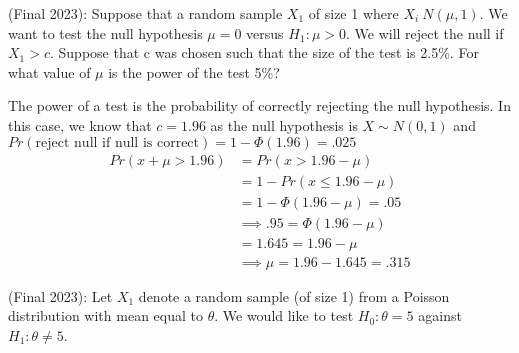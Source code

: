\documentclass[answers]{exam}
\begin{document}
\begin{questions}
\question (Final 2023): Suppose that a random sample $X_1$ of size 1 where $X_i ~ N(\mu,1)$. We want to test the null hypothesis $\mu=0$ versus $H_1: \mu > 0$. We will reject the null if $X_1 > c$. Suppose that c was chosen such that the size of the test is 2.5\%. For what value of $\mu$ is the power of the test 5\%?
\begin{solution}
    The power of a test is the probability of correctly rejecting the null hypothesis. In this case, we know that $c = 1.96$ as the null hypothesis is $X \sim N(0,1)$ and\\
     $Pr(\text{reject null if null is correct}) = 1-\Phi(1.96)=.025$
     \begin{align*}
        Pr(x+\mu > 1.96) &= Pr(x > 1.96 - \mu)\\
        &= 1-Pr(x \leq 1.96 - \mu)\\
        &= 1-\Phi(1.96 - \mu) = .05\\
        &\implies .95 = \Phi(1.96 - \mu)\\
        &= 1.645 = 1.96 - \mu\\
        &\implies \mu = 1.96-1.645 = .315
     \end{align*}
\end{solution}

\question (Final 2023): Let $X_1$ denote a random sample (of size 1) from a Poisson distribution with mean equal to $\theta$. We would like to test $H_0 : \theta = 5$ against $H_1 : \theta \ne 5$. 
\end{questions}
\end{document}
